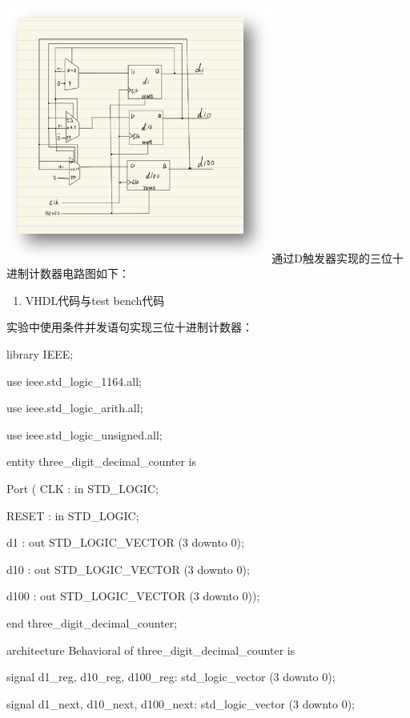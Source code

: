 \documentclass{article} %
\begin{document}
\noindent \includegraphics*[width=3.45in, height=3.33in]{image2}通过D触发器实现的三位十进制计数器电路图如下：

\begin{enumerate}
    \item  VHDL代码与test bench代码
\end{enumerate}

实验中使用条件并发语句实现三位十进制计数器：

\noindent library IEEE;

\noindent use ieee.std\_logic\_1164.all;

\noindent use ieee.std\_logic\_arith.all;

\noindent use ieee.std\_logic\_unsigned.all;

\noindent

\noindent entity three\_digit\_decimal\_counter is

\noindent     Port ( CLK : in STD\_LOGIC;

\noindent            RESET : in STD\_LOGIC;

\noindent            d1 : out STD\_LOGIC\_VECTOR (3 downto 0);

\noindent            d10 : out STD\_LOGIC\_VECTOR (3 downto 0);

\noindent            d100 : out STD\_LOGIC\_VECTOR (3 downto 0));

\noindent end three\_digit\_decimal\_counter;

\noindent

\noindent architecture Behavioral of three\_digit\_decimal\_counter is

\noindent signal d1\_reg, d10\_reg, d100\_reg: std\_logic\_vector (3 downto 0);

\noindent signal d1\_next, d10\_next, d100\_next: std\_logic\_vector (3 downto 0);
\end{document}
